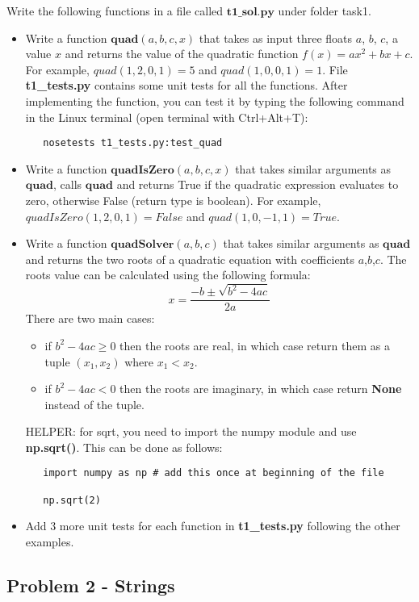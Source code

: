 \documentclass[11pt,a4paper]{report}
\begin{document}
Write the following functions in a file called $\textbf{t1\_sol.py}$ under folder task1.
\begin{itemize}
 \item Write a function $\textbf{quad}(a, b, c, x)$ that takes as input three floats $a$, $b$, $c$, a value $x$ and returns the value of the quadratic function $f(x) = ax^2 +bx +c$. For example, $quad(1,2,0,1) = 5$ and $quad(1,0,0,1) = 1$. File \textbf{t1\_tests.py} contains some unit tests for all the functions. After implementing the function, you can test it by typing the following command in the Linux terminal (open terminal with Ctrl+Alt+T):
  \begin{lstlisting}
   nosetests t1_tests.py:test_quad
  \end{lstlisting}
 \item Write a function $\textbf{quadIsZero}(a, b, c, x)$ that takes similar arguments as $\textbf{quad}$, calls $\textbf{quad}$ and returns True if the quadratic expression evaluates to zero, otherwise False (return type is boolean). For example, $quadIsZero(1,2,0,1) = False$ and $quad(1,0,-1,1) = True$. 
 \item Write a function $\textbf{quadSolver}(a, b, c)$ that takes similar arguments as $\textbf{quad}$ and returns the two roots of a quadratic equation with coefficients $a$,$b$,$c$. The roots value can be calculated using the following formula:
 $$ x = \frac{-b \pm \sqrt{b^2 - 4ac}}{2a}$$
 There are two main cases:
 \begin{itemize}
  \item if $b^2 - 4ac \ge 0 $ then the roots are real, in which case return them as a tuple $(x_1,x_2)$ where $x_1 < x_2$. 
  \item if $b^2 - 4ac < 0 $ then the roots are imaginary, in which case return \textbf{None} instead of the tuple.
 \end{itemize}
 HELPER: for sqrt, you need to import the numpy module and use \textbf{np.sqrt()}. This can be done as follows:
   \begin{lstlisting}
   import numpy as np # add this once at beginning of the file
   
   np.sqrt(2)
  \end{lstlisting}
 \item Add 3 more unit tests for each function in \textbf{t1\_tests.py} following the other examples.
\end{itemize}

\subsection*{Problem 2 - Strings}
\end{document}
